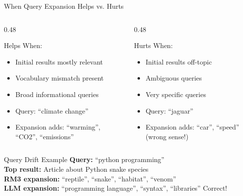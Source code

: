 \documentclass[aspectratio=169]{beamer}
\begin{document}
\begin{frame}{When Query Expansion Helps vs. Hurts}
\begin{columns}
\begin{column}{0.48\textwidth}
\begin{block}{\checkmark Helps When:}
\begin{itemize}
    \item Initial results mostly relevant
    \item Vocabulary mismatch present
    \item Broad informational queries
    \item Query: ``climate change''
    \item Expansion adds: ``warming'', ``CO2'', ``emissions''
\end{itemize}
\end{block}
\end{column}

\begin{column}{0.48\textwidth}
\begin{alertblock}{ Hurts When:}
\begin{itemize}
    \item Initial results off-topic
    \item Ambiguous queries
    \item Very specific queries
    \item Query: ``jaguar''
    \item Expansion adds: ``car'', ``speed'' (wrong sense!)
\end{itemize}
\end{alertblock}
\end{column}
\end{columns}

\vspace{1em}

\begin{exampleblock}{Query Drift Example}
\textbf{Query:} ``python programming'' \\
\textbf{Top result:} Article about Python snake species \\
\textbf{RM3 expansion:} ``reptile'', ``snake'', ``habitat'', ``venom'' \\
\textbf{LLM expansion:} ``programming language'', ``syntax'', ``libraries'' \textcolor{green}{\checkmark} Correct!
\end{exampleblock}
\end{frame}

\end{document}
